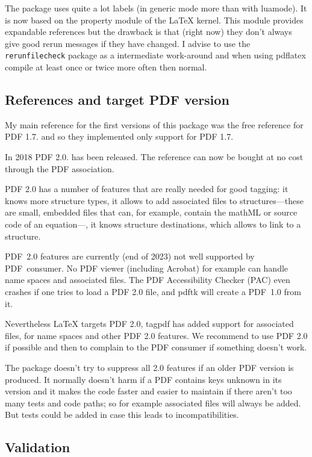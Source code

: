 \documentclass[bibliography=totoc,a4paper]{article}
\newcommand\pkg[1]{\texttt{#1}}
\newcommand\PDF{PDF}
\begin{document}
The package uses quite a lot labels (in generic mode more than with luamode). 
It is now based on the property module of the \LaTeX{} kernel. This module 
provides expandable references but the drawback is that (right now) they don't always give 
good rerun messages if they have changed. I advise to use the 
\pkg{rerunfilecheck} package as a intermediate work-around and when using 
pdflatex compile at least once or twice more often then normal. 


\subsection{References and target PDF version}

My main reference for the first versions of this package was the free 
reference for \PDF{} 1.7. \parencite{pdfreference} and so they implemented 
only support for \PDF{} 1.7. 

In 2018 \PDF{} 2.0. has been released. The reference can now be bought at no 
cost through the PDF association. 

\PDF{} 2.0 has a number of features that are really needed for good tagging: 
it knows more structure types, it allows to add associated files to 
structures---these are small, embedded files that can, for example, contain 
the mathML or source code of an equation---, it knows structure destinations, 
which allows to link to a structure. 

\PDF{}~2.0 features are currently (end of 2023) not well supported by 
\PDF~consumer. No PDF viewer (including Acrobat) for example can handle name 
spaces and associated files. The PDF Accessibility Checker (PAC) even crashes 
if one tries to load a \PDF{} 2.0 file, and pdftk will create a \PDF{}~1.0 
from it. 

Nevertheless \LaTeX{} targets \PDF{} 2.0, tagpdf has added support for 
associated files, for name spaces and other \PDF{} 2.0 features. We recommend 
to use \PDF{} 2.0 if possible and then to complain to the PDF{} consumer if 
something doesn't work.   

The package doesn't try to suppress all 2.0 features if an older \PDF{} 
version is produced. It normally doesn't harm if a \PDF{} contains keys 
unknown in its version and it makes the code faster and easier to maintain if 
there aren't too many tests and code paths; so for example associated files 
will always be added. But tests could be added in case this leads to 
incompatibilities. 


\subsection{Validation}
\end{document}
